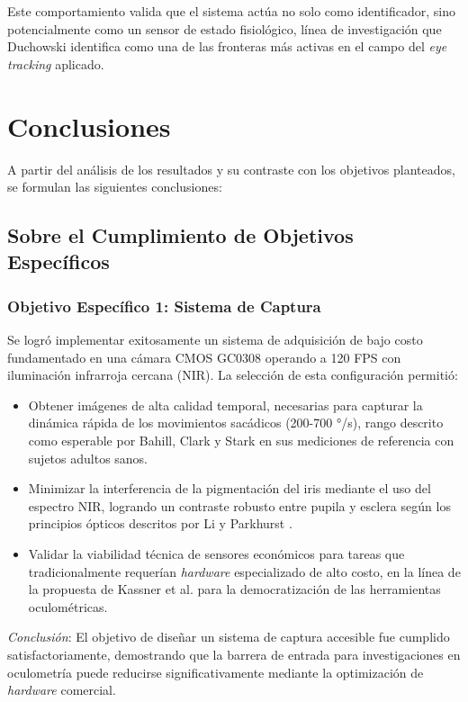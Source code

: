Este comportamiento valida que el sistema actúa no solo como identificador, sino potencialmente como un sensor de estado fisiológico, línea de investigación que Duchowski \cite{duchowski2017} identifica como una de las fronteras más activas en el campo del \textit{eye tracking} aplicado.
\section{Conclusiones}

A partir del análisis de los resultados y su contraste con los objetivos planteados, se formulan las siguientes conclusiones:

\subsection{Sobre el Cumplimiento de Objetivos Específicos}

\subsubsection{Objetivo Específico 1: Sistema de Captura}

Se logró implementar exitosamente un sistema de adquisición de bajo costo fundamentado en una cámara CMOS GC0308 operando a 120 FPS con iluminación infrarroja cercana (NIR).
La selección de esta configuración permitió:

\begin{itemize}
	\item Obtener imágenes de alta calidad temporal, necesarias para capturar la dinámica rápida de los movimientos sacádicos (200-700 °/s), rango descrito como esperable por Bahill, Clark y Stark \cite{bahill1975} en sus mediciones de referencia con sujetos adultos sanos.
	\item Minimizar la interferencia de la pigmentación del iris mediante el uso del espectro NIR, logrando un contraste robusto entre pupila y esclera según los principios ópticos descritos por Li y Parkhurst \cite{li2005starburst}.
	\item Validar la viabilidad técnica de sensores económicos para tareas que tradicionalmente requerían \textit{hardware} especializado de alto costo, en la línea de la propuesta de Kassner et al.
	\cite{kassner2014pupil} para la democratización de las herramientas oculométricas.
\end{itemize}

\textit{Conclusión}: El objetivo de diseñar un sistema de captura accesible fue cumplido satisfactoriamente, demostrando que la barrera de entrada para investigaciones en oculometría puede reducirse significativamente mediante la optimización de \textit{hardware} comercial.
